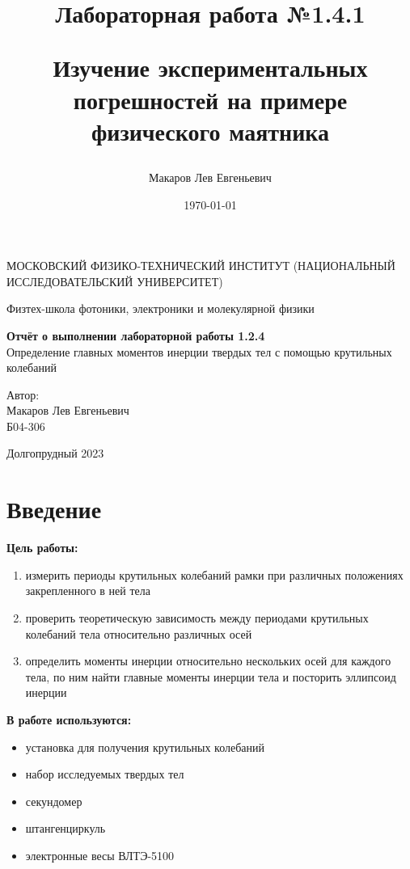 \documentclass[a4paper,12pt]{article}
\author{Макаров Лев Евгеньевич}
\title{Лабораторная работа №1.4.1

Изучение экспериментальных погрешностей на примере физического маятника
}
\date{\today}
\begin{document}
\begin{titlepage}
	\begin{center}
		{\large МОСКОВСКИЙ ФИЗИКО-ТЕХНИЧЕСКИЙ ИНСТИТУТ (НАЦИОНАЛЬНЫЙ ИССЛЕДОВАТЕЛЬСКИЙ УНИВЕРСИТЕТ)}
	\end{center}
	\begin{center}
		{\large Физтех-школа фотоники, электроники и молекулярной физики}
	\end{center}
	
	
	\vspace{4.5cm}
	{\huge
		\begin{center}
			{\bf Отчёт о выполнении лабораторной работы 1.2.4}\\
			Определение главных моментов инерции твердых тел с помощью крутильных колебаний
		\end{center}
	}
	\vspace{2cm}
	\begin{flushright}
		{\LARGE Автор:\\ Макаров Лев Евгеньевич \\
			\vspace{0.2cm}
			Б04-306}
	\end{flushright}
	\vspace{8cm}
	\begin{center}
		Долгопрудный 2023
	\end{center}
\end{titlepage}


\section{Введение}

\textbf{Цель работы:} 
\begin{enumerate}
	\item измерить периоды крутильных колебаний рамки при различных положениях закрепленного в ней тела
	\item проверить теоретическую зависимость между периодами крутильных колебаний тела относительно различных осей
        \item определить моменты инерции относительно нескольких осей для каждого тела, по ним найти главные моменты инерции тела и посторить эллипсоид инерции
\end{enumerate}

\textbf{В работе используются:} 
\begin{itemize}
    \item установка для получения крутильных колебаний
    \item набор исследуемых твердых тел
    \item секундомер
    \item штангенциркуль
    \item электронные весы ВЛТЭ-5100
\end{itemize}
\medskip
\end{document}
